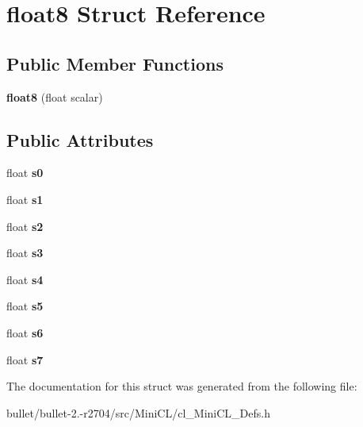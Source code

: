 \hypertarget{structfloat8}{\section{float8 Struct Reference}
\label{structfloat8}
}
\subsection*{Public Member Functions}
\begin{DoxyCompactItemize}
\item 
\hypertarget{structfloat8_a75d30699db80fa3be5ef05a4330a8d45}{{\bfseries float8} (float scalar)}\label{structfloat8_a75d30699db80fa3be5ef05a4330a8d45}

\end{DoxyCompactItemize}
\subsection*{Public Attributes}
\begin{DoxyCompactItemize}
\item 
\hypertarget{structfloat8_ad629e5af1f2d32ce19bfb87d4cd68143}{float {\bfseries s0}}\label{structfloat8_ad629e5af1f2d32ce19bfb87d4cd68143}

\item 
\hypertarget{structfloat8_a729fc0ae2c7dab9f38c22a390ffbe997}{float {\bfseries s1}}\label{structfloat8_a729fc0ae2c7dab9f38c22a390ffbe997}

\item 
\hypertarget{structfloat8_a8edd603071c6b8ef930e23c595426ebd}{float {\bfseries s2}}\label{structfloat8_a8edd603071c6b8ef930e23c595426ebd}

\item 
\hypertarget{structfloat8_a7d8e4c8446ec1990e342af610f8d8040}{float {\bfseries s3}}\label{structfloat8_a7d8e4c8446ec1990e342af610f8d8040}

\item 
\hypertarget{structfloat8_a683cac3364c387458a8c9378192b61af}{float {\bfseries s4}}\label{structfloat8_a683cac3364c387458a8c9378192b61af}

\item 
\hypertarget{structfloat8_a05742d48d516b351f050bd419e131691}{float {\bfseries s5}}\label{structfloat8_a05742d48d516b351f050bd419e131691}

\item 
\hypertarget{structfloat8_ac46b15ec27167156ab270bb6fa9787a1}{float {\bfseries s6}}\label{structfloat8_ac46b15ec27167156ab270bb6fa9787a1}

\item 
\hypertarget{structfloat8_a2c36be91ebc07b9f5a5b8bedd66b2b9e}{float {\bfseries s7}}\label{structfloat8_a2c36be91ebc07b9f5a5b8bedd66b2b9e}

\end{DoxyCompactItemize}


The documentation for this struct was generated from the following file\+:\begin{DoxyCompactItemize}
\item 
bullet/bullet-\/2.-\/r2704/src/\+Mini\+C\+L/cl\+\_\+\+Mini\+C\+L\+\_\+\+Defs.\+h\end{DoxyCompactItemize}
